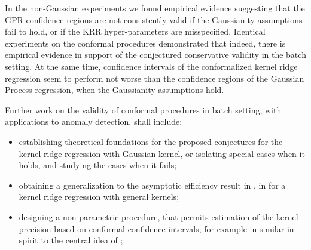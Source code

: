 \documentclass[a4paper,14pt]{extarticle}
\begin{document}
In the non-Gaussian experiments we found empirical evidence suggesting that the GPR
confidence regions are not consistently valid if the Gaussianity assumptions fail
to hold, or if the KRR hyper-parameters are misspecified. Identical experiments on
the conformal procedures demonstrated that indeed, there is empirical evidence in
support of the conjectured conservative validity in the batch setting. At the same
time, confidence intervals of the conformalized kernel ridge regression seem to
perform not worse than the confidence regions of the Gaussian Process regression,
when the Gaussianity assumptions hold.

Further work on the validity of conformal procedures in batch setting, with applications
to anomaly detection, shall include: \begin{itemize}
  \item establishing theoretical foundations for the proposed conjectures for the
  kernel ridge regression with Gaussian kernel, or isolating special cases when it
  holds, and studying the cases when it fails;
  \item obtaining a generalization to the asymptotic efficiency result in \cite{burnaevV14},
  in for a kernel ridge regression with general kernels;
  \item designing a non-parametric procedure, that permits estimation of the kernel
  precision based on conformal confidence intervals, for example in similar in spirit
  to the central idea of \cite{goldenshluger1997};
\end{itemize}
\end{document}
